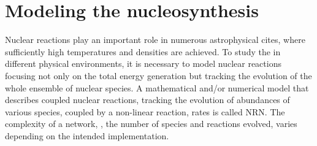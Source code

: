 \section{Modeling the nucleosynthesis}

Nuclear reactions play an important role in numerous astrophysical cites, where sufficiently high temperatures 
and densities are achieved. 
%
To study the \nuc{} in different physical environments, it is necessary to model nuclear reactions focusing 
not only on the total energy generation \citep[\eg][]{Weaver:1978,Mueller:1986,Timmes:1999} but tracking the 
evolution of the whole ensemble of nuclear species. A mathematical and/or numerical model that describes 
coupled nuclear reactions, tracking the evolution of abundances of various species, coupled by a non-linear 
reaction, rates is called \ac{NRN}.
%
The complexity of a network, \ie, the number of species and reactions evolved, 
varies depending on the intended implementation. 
%
%
